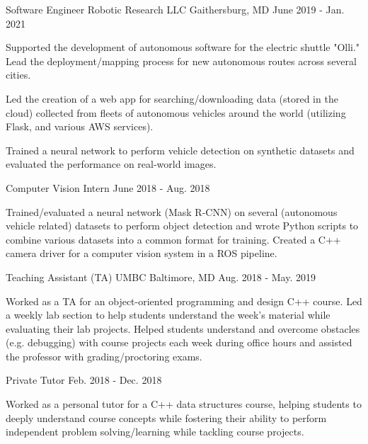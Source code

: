 \begin{cventries}
  \cventry
    {Software Engineer} %
    {Robotic Research LLC} %
    {Gaithersburg, MD} %
    {June 2019 - Jan. 2021} %
    {
      \begin{cvitems} %
        \item {Supported the development of autonomous software for the electric 
          shuttle "Olli."  Lead the deployment/mapping process for new autonomous routes across several cities.}
        \item {Led the creation of a web app for searching/downloading data (stored in the cloud) collected from fleets of autonomous vehicles around the world (utilizing Flask, and various AWS services).}
        \item {Trained a neural network to perform vehicle detection on synthetic datasets and evaluated the performance on real-world images.}
      \end{cvitems}
    }

  \cventry
    {Computer Vision Intern} %
    {} %
    {} %
    {June 2018 - Aug. 2018} %
    {
      \begin{cvitems} %
        \item {Trained/evaluated a neural network (Mask R-CNN) on several (autonomous vehicle related) datasets to perform object detection and wrote Python scripts to combine various datasets into a common format for training.  Created a C++ camera driver for a computer vision system in a ROS pipeline.}
      \end{cvitems}
    }


  \cventry
    {Teaching Assistant (TA)} %
    {UMBC} %
    {Baltimore, MD} %
    {Aug. 2018 - May. 2019} %
    {
      \begin{cvitems} %
        \item{Worked as a TA for an object-oriented programming and design C++ course.  Led a weekly lab section to help students understand the week's material while evaluating their lab projects.  Helped students understand and overcome obstacles (e.g. debugging) with course projects each week during office hours and assisted the professor with grading/proctoring exams.}
      \end{cvitems}
    }

  \cventry
    {Private Tutor} %
    {} %
    {} %
    {Feb. 2018 - Dec. 2018} %
    {
      \begin{cvitems} %
        \item{Worked as a personal tutor for a C++ data structures course, helping students to deeply understand course concepts while fostering their ability to perform independent problem solving/learning while tackling course projects.}
      \end{cvitems}
    }


\end{cventries}
